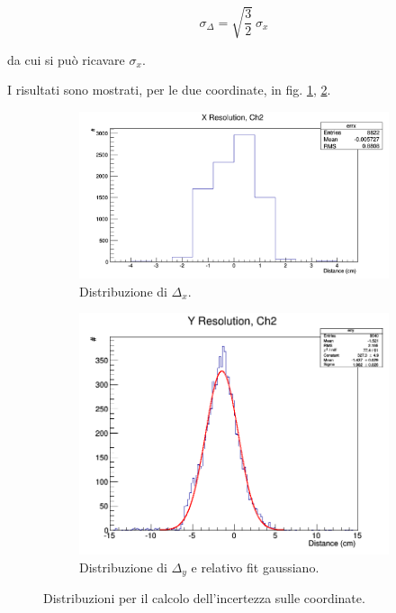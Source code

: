 \documentclass[8pt]{extarticle}
\begin{document}
\[ \sigma_\Delta = \sqrt{\frac{3}{2}} \ \sigma_x  \]

da cui si può ricavare $\sigma_x$.

I risultati sono mostrati, per le due coordinate, in fig. \ref{fig:errx}, \ref{fig:erry}.

\begin{figure}
\centering
\begin{subfigure}{.5\textwidth}
  \centering
  \includegraphics[width=1\linewidth]{errx}
  \caption{Distribuzione di $\Delta_x$.}
  \label{fig:errx}
\end{subfigure}%
\begin{subfigure}{.5\textwidth}
  \centering
  \includegraphics[width=1\linewidth]{erry}
  \caption{Distribuzione di $\Delta_y$ e relativo fit gaussiano.}
  \label{fig:erry}
\end{subfigure}
\caption{Distribuzioni per il calcolo dell'incertezza sulle coordinate.}
\label{fig:err_coordinate}
\end{figure}
\end{document}

